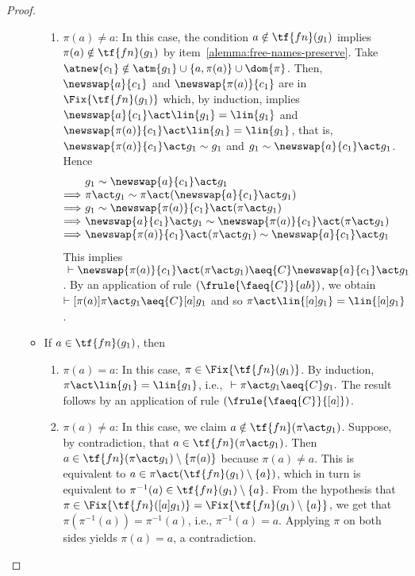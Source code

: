 \begin{proof}
\begin{enumerate}
\begin{itemize}
\begin{enumerate}
                    \item $\pi(a) \neq a$: In this case, the condition $a\notin\tf{fn}(g_1)$ implies $\pi(a)\notin \tf{fn}(g_1)$ by item~\ref{alemma:free-names-preserve}. Take $\atnew{c_1}\notin \atm{g_1}\cup\{a,\pi(a)\}\cup\dom{\pi}$. Then, $\newswap{a}{c_1}$ and $\newswap{\pi(a)}{c_1}$ are in $\Fix{\tf{fn}(g_1)}$ which, by induction, implies $\newswap{a}{c_1}\act \lin{g_1} = \lin{g_1}$ and $\newswap{\pi(a)}{c_1}\act \lin{g_1} = \lin{g_1}$, that is, $\newswap{\pi(a)}{c_1}\act g_1 \sim g_1$ and $g_1 \sim \newswap{a}{c_1}\act g_1$. Hence
                    \begin{equation*}
                        \begin{tabular}{@{}r@{ }lll@{}}
                             & $g_1 \sim \newswap{a}{c_1}\act g_1$ &  & \\
                             $\Longrightarrow$ & $\pi\act g_1 \sim \pi\act (\newswap{a}{c_1}\act g_1)$ &\\
                            $\Longrightarrow$ & $g_1 \sim \newswap{\pi(a)}{c_1}\act (\pi\act g_1)$ & \\
                            $\Longrightarrow$ & $\newswap{a}{c_1}\act g_1 \sim \newswap{\pi(a)}{c_1}\act (\pi\act g_1)$ & \\
                            $\Longrightarrow$ & $\newswap{\pi(a)}{c_1}\act (\pi\act g_1) \sim \newswap{a}{c_1}\act g_1$ &
                        \end{tabular}
                    \end{equation*}
                    This implies $~\vdash \newswap{\pi(a)}{c_1}\act (\pi\act g_1)  \aeq{C} \newswap{a}{c_1}\act g_1$. By an application of rule $(\frule{\faeq{C}}{ab})$, we obtain $\vdash [\pi(a)]\pi\act g_1 \aeq{C} [a]g_1$ and so $\pi\act \lin{[a]g_1} = \lin{[a]g_1}$.
                \end{enumerate}

                \item If $a\in \tf{fn}(g_1)$, then
                \begin{enumerate}
                    \item $\pi(a) = a$: In this case, $\pi\in\Fix{\tf{fn}(g_1)}$. By induction, $\pi\act\lin{g_1} = \lin{g_1}$, i.e., $~\vdash \pi\act g_1 \aeq{C} g_1.$ The result follows by an application of rule $(\frule{\faeq{C}}{[a]})$.

                    \item $\pi(a) \neq a$: In this case, we claim $a\notin\tf{fn}(\pi\act g_1)$.  Suppose, by contradiction, that $a\in\tf{fn}(\pi\act g_1)$. Then $a\in \tf{fn}(\pi\act g_1)\setminus\{\pi(a)\}$ because $\pi(a)\neq a$. This is equivalent to $a\in \pi\act(\tf{fn}(g_1)\setminus\{a\})$, which in turn is equivalent to $\pi^{-1}(a) \in \tf{fn}(g_1)\setminus\{a\}$. From the hypothesis that $\pi\in\Fix{\tf{fn}([a]g_1)} = \Fix{\tf{fn}(g_1)\setminus\{a\}}$, we get that $\pi(\pi^{-1}(a)) = \pi^{-1}(a)$, i.e., $\pi^{-1}(a) = a$. Applying $\pi$ on both sides yields $\pi(a) = a$, a contradiction.


\end{enumerate}
\end{itemize}
\end{enumerate}
\end{proof}
